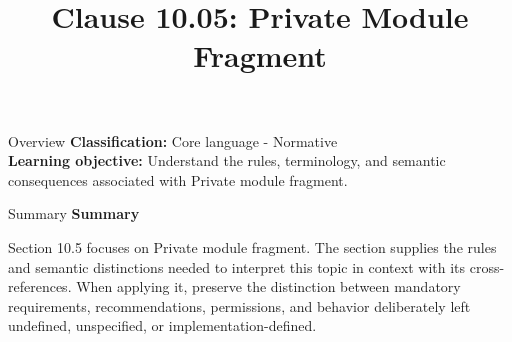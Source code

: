 \documentclass[10pt,letterpaper]{article}
\title{Clause 10.05: Private Module Fragment}
\author{}
\date{}
\begin{document}
\maketitle
\begin{CornellOverviewBox}{Overview}
\textbf{Classification:} Core language - Normative\\[2pt]
\textbf{Learning objective:} Understand the rules, terminology, and semantic consequences associated with Private module fragment.
\end{CornellOverviewBox}\begin{CornellSummaryBox}{Summary}
{\sffamily\bfseries\color{Accent} Summary}\par\vspace{3pt}Section 10.5 focuses on Private module fragment. The section supplies the rules and semantic distinctions needed to interpret this topic in context with its cross-references. When applying it, preserve the distinction between mandatory requirements, recommendations, permissions, and behavior deliberately left undefined, unspecified, or implementation-defined.
\end{CornellSummaryBox}
\end{document}

